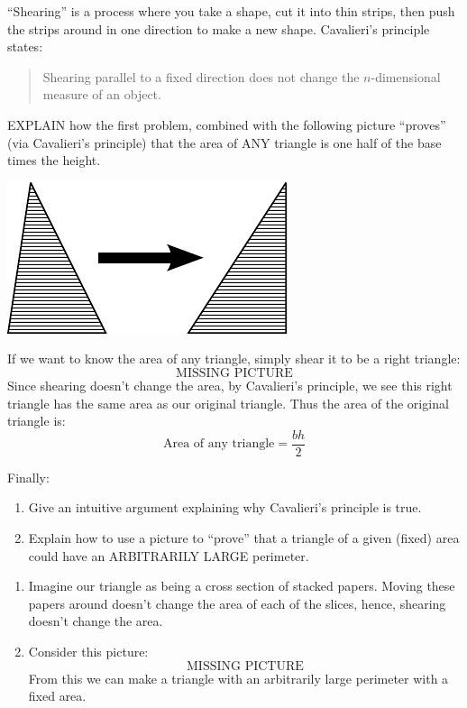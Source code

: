 \documentclass[handout,nooutcomes,noauthor]{ximera}
\begin{document}
\begin{question}
  ``Shearing'' is a process where you take a shape, cut it into thin strips, 
  then push the strips around in one direction to make a new shape.  
  Cavalieri's principle states:
  \begin{quote}
    Shearing parallel to a fixed direction does not change the
    $n$-dimensional measure of an object.
  \end{quote}
  EXPLAIN how the first problem, combined with the following
  picture ``proves'' (via Cavalieri's principle) that the area of ANY
  triangle is one half of the base times the height.
  \begin{center}
  \includegraphics{pbpShearTri.pdf}
  \end{center}
  \begin{freeResponse}
    If we want to know the area of any triangle, simply shear it to be a right triangle:
    \[
    \text{MISSING PICTURE}
    \]
    Since shearing doesn't change the area, by Cavalieri's principle,
    we see this right triangle has the same area as our original
    triangle. Thus the area of the original triangle is:
    \[
    \text{Area of any triangle} = \frac{bh}{2}
    \]
  \end{freeResponse}
\end{question}
\mynewpage


\begin{question} Finally:
  \begin{enumerate}
  \item Give an intuitive argument explaining why Cavalieri's
    principle is true.
  \item Explain how to use a picture to ``prove'' that a triangle of a
    given (fixed) area could have an ARBITRARILY LARGE perimeter.
  \end{enumerate}
  \begin{freeResponse}
    \begin{enumerate}
    \item Imagine our triangle as being a cross section of stacked
      papers. Moving these papers around doesn't change the area of
      each of the slices, hence, shearing doesn't change the area.
    \item Consider this picture:
      \[
      \text{MISSING PICTURE}
      \]
      From this we can make a triangle with an arbitrarily large
      perimeter with a fixed area.
    \end{enumerate}
  \end{freeResponse}
\end{question}
\end{document}
